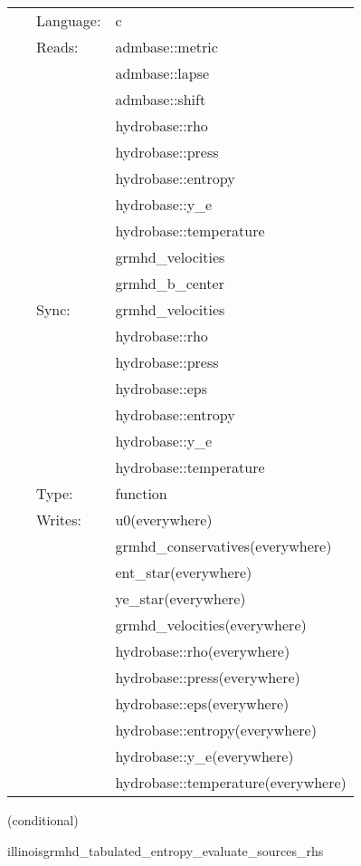 \documentclass{article}
\begin{document}
 \begin{tabular*}{160mm}{cll} 
~ & Language:  & c \\ 
~ & Reads:  & admbase::metric \\ 
~& ~ &admbase::lapse\\ 
~& ~ &admbase::shift\\ 
~& ~ &hydrobase::rho\\ 
~& ~ &hydrobase::press\\ 
~& ~ &hydrobase::entropy\\ 
~& ~ &hydrobase::y\_e\\ 
~& ~ &hydrobase::temperature\\ 
~& ~ &grmhd\_velocities\\ 
~& ~ &grmhd\_b\_center\\ 
~ & Sync:  & grmhd\_velocities \\ 
~& ~ &hydrobase::rho\\ 
~& ~ &hydrobase::press\\ 
~& ~ &hydrobase::eps\\ 
~& ~ &hydrobase::entropy\\ 
~& ~ &hydrobase::y\_e\\ 
~& ~ &hydrobase::temperature\\ 
~ & Type:  & function \\ 
~ & Writes:  & u0(everywhere) \\ 
~& ~ &grmhd\_conservatives(everywhere)\\ 
~& ~ &ent\_star(everywhere)\\ 
~& ~ &ye\_star(everywhere)\\ 
~& ~ &grmhd\_velocities(everywhere)\\ 
~& ~ &hydrobase::rho(everywhere)\\ 
~& ~ &hydrobase::press(everywhere)\\ 
~& ~ &hydrobase::eps(everywhere)\\ 
~& ~ &hydrobase::entropy(everywhere)\\ 
~& ~ &hydrobase::y\_e(everywhere)\\ 
~& ~ &hydrobase::temperature(everywhere)\\ 
\end{tabular*} 


\vspace{5mm}

   (conditional) 

\hspace{5mm} illinoisgrmhd\_tabulated\_entropy\_evaluate\_sources\_rhs 
\end{document}
